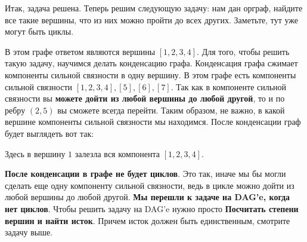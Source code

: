 \documentclass{article}
\begin{document}
Итак, задача решена. Теперь решим следующую задачу: нам дан орграф, найдите все такие вершины, что из них можно пройти до всех других. Заметьте, тут уже могут быть циклы.

    \begin{center}
    \end{center}
В этом графе ответом являются вершины $[1,2,3,4]$. 
Для того, чтобы решить такую задачу, научимся делать конденсацию графа. 
Конденсация графа сжимает компоненты сильной связности в одну вершину. 
В этом графе есть компоненты сильной связности $[1,2,3,4], [5], [6], [7]$. 
Так как в компоненте сильной связности вы \textbf{можете дойти из любой вершины до любой другой}, то и по ребру $(2,5)$ вы сможете всегда перейти. Таким образом, не важно, в какой вершине компоненты сильной связности мы находимся. После конденсации граф будет выглядеть вот так:
\begin{center}
    \end{center}
Здесь в вершину $1$ залезла вся компонента $[1,2,3,4]$. 

\textbf{После конденсации в графе не будет циклов}. Это так, иначе мы бы могли сделать еще одну компоненту сильной связности, ведь в цикле можно дойти из любой вершины до любой другой. 
\textbf{Мы перешли к задаче на DAG'e, когда нет циклов}. Чтобы решить задачу на DAG'e нужно просто \textbf{Посчитать степени вершин и найти исток}. Причем исток должен быть единственным, смотрите задачу выше. 
\end{document}
